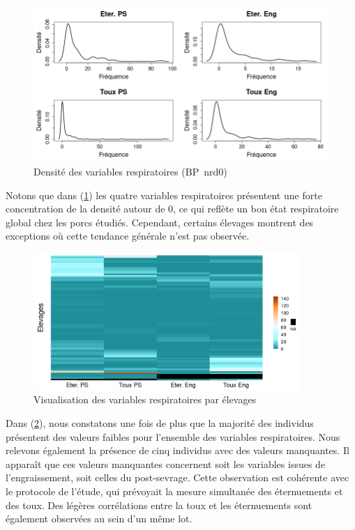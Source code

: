 \documentclass{article}
\begin{document}
\begin{figure}[h]
    \centering
    \includegraphics[width=\textwidth]{img_var_resp/dens_var_resp.png}
    \caption{Densité des variables respiratoires (BP\protect\footnotemark\ \text{: }nrd0\protect\footnotemark)}\label{fig:dens_resp}
\end{figure}

\addtocounter{footnote}{-1}
\addtocounter{footnote}{1}

Notons que dans (\ref{fig:dens_resp}) les quatre variables respiratoires présentent une forte concentration de la densité autour de 0, ce qui reflète un bon état respiratoire global chez les porcs étudiés. Cependant, certains élevages montrent des exceptions où cette tendance générale n'est pas observée.

\begin{figure}[h]
    \centering
    \includegraphics[width=0.9\textwidth]{img_var_resp/rep_var_resp.png}
    \caption{Visualisation des variables respiratoires par élevages}\label{fig:rep_resp}
\end{figure}
\newpage
Dans (\ref{fig:rep_resp}), nous constatons une fois de plus que la majorité des individus présentent des valeurs faibles pour l'ensemble des variables respiratoires. Nous relevons également la présence de cinq individus avec des valeurs manquantes. Il apparaît que ces valeurs manquantes concernent soit les variables issues de l'engraissement, soit celles du post-sevrage. Cette observation est cohérente avec le protocole de l'étude, qui prévoyait la mesure simultanée des éternuements et des toux.
Des légères corrélations entre la toux et les éternuements sont également observées au sein d'un même lot.
\end{document}

